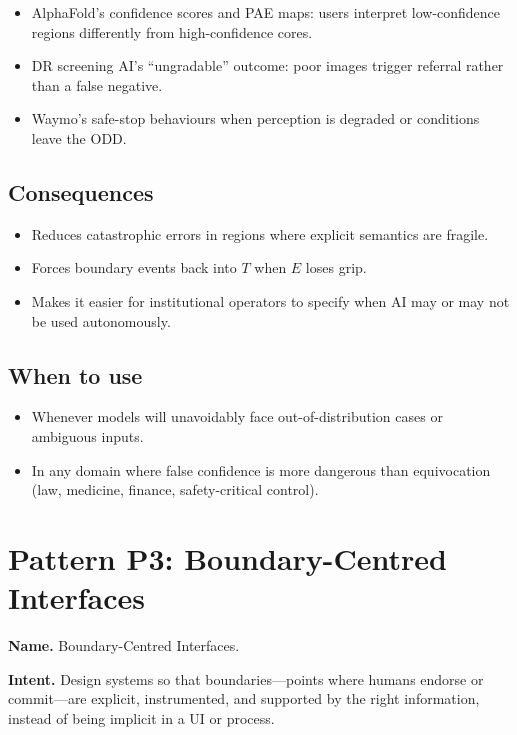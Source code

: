 \begin{itemize}
  \item AlphaFold’s confidence scores and PAE maps:
        users interpret low-confidence regions differently from
        high-confidence cores.
  \item DR screening AI’s ``ungradable'' outcome:
        poor images trigger referral rather than a false negative.
  \item Waymo’s safe-stop behaviours when perception is degraded or
        conditions leave the ODD.
\end{itemize}

\subsection*{Consequences}

\begin{itemize}
  \item Reduces catastrophic errors in regions where explicit semantics
        are fragile.
  \item Forces boundary events back into \(T\) when \(E\) loses grip.
  \item Makes it easier for institutional operators to specify when AI
        may or may not be used autonomously.
\end{itemize}

\subsection*{When to use}

\begin{itemize}
  \item Whenever models will unavoidably face out-of-distribution cases
        or ambiguous inputs.
  \item In any domain where false confidence is more dangerous than
        equivocation (law, medicine, finance, safety-critical control).
\end{itemize}

\section{Pattern P3: Boundary-Centred Interfaces}
\label{pattern:p3}

\textbf{Name.} Boundary-Centred Interfaces.

\textbf{Intent.} Design systems so that boundaries---points where humans
endorse or commit---are explicit, instrumented, and supported by the
right information, instead of being implicit in a UI or process.

